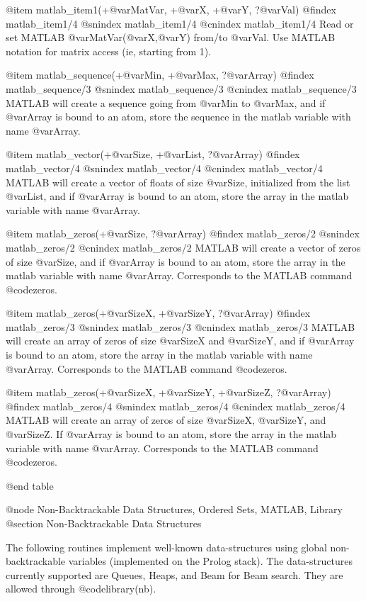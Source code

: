 @item matlab_item1(+@var{MatVar}, +@var{X}, +@var{Y}, ?@var{Val})
@findex matlab_item1/4
@snindex matlab_item1/4
@cnindex matlab_item1/4
Read or set MATLAB @var{MatVar}(@var{X},@var{Y}) from/to @var{Val}. Use
MATLAB notation for matrix access (ie, starting from 1).

@item matlab_sequence(+@var{Min}, +@var{Max}, ?@var{Array})
@findex matlab_sequence/3
@snindex matlab_sequence/3
@cnindex matlab_sequence/3
MATLAB will create a sequence going from @var{Min} to @var{Max}, and
if @var{Array} is bound to an atom, store the sequence in the matlab
variable with name @var{Array}.

@item matlab_vector(+@var{Size}, +@var{List}, ?@var{Array})
@findex matlab_vector/4
@snindex matlab_vector/4
@cnindex matlab_vector/4
MATLAB will create a vector of floats of size @var{Size}, initialized
from the list @var{List}, and if @var{Array} is bound to an atom,
store the array in the matlab variable with name @var{Array}.

@item matlab_zeros(+@var{Size}, ?@var{Array})
@findex matlab_zeros/2
@snindex matlab_zeros/2
@cnindex matlab_zeros/2
MATLAB will create a vector of zeros of size @var{Size}, and if
@var{Array} is bound to an atom, store the array in the matlab
variable with name @var{Array}. Corresponds to the MATLAB command
@code{zeros}.

@item matlab_zeros(+@var{SizeX}, +@var{SizeY}, ?@var{Array})
@findex matlab_zeros/3
@snindex matlab_zeros/3
@cnindex matlab_zeros/3
MATLAB will create an array of zeros of size @var{SizeX} and
@var{SizeY}, and if @var{Array} is bound to an atom, store the array
in the matlab variable with name @var{Array}.  Corresponds to the
MATLAB command @code{zeros}.


@item matlab_zeros(+@var{SizeX}, +@var{SizeY}, +@var{SizeZ}, ?@var{Array})
@findex matlab_zeros/4
@snindex matlab_zeros/4
@cnindex matlab_zeros/4
MATLAB will create an array of zeros of size @var{SizeX}, @var{SizeY},
and @var{SizeZ}. If @var{Array} is bound to an atom, store the array
in the matlab variable with name @var{Array}.  Corresponds to the
MATLAB command @code{zeros}.




@end table

@node Non-Backtrackable Data Structures, Ordered Sets, MATLAB, Library
@section Non-Backtrackable Data Structures

The following routines implement well-known data-structures using global
non-backtrackable variables (implemented on the Prolog stack). The
data-structures currently supported are Queues, Heaps, and Beam for Beam
search. They are allowed through @code{library(nb)}. 

